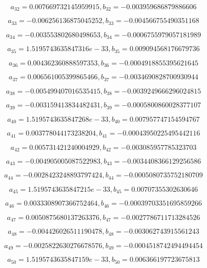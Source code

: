 \documentclass[12pt]{article}
\begin{document}
$$a_{ 32 } = 0.007669732145959915 , b_{ 32 } = -0.003959686879886606$$

$$a_{ 33 } = -0.006256136875045252 , b_{ 33 } = -0.004566755490351168$$

$$a_{ 34 } = -0.003553802680498653 , b_{ 34 } = -0.0006755979057181989$$

$$a_{ 35 } = 1.5195743635847316e-33 , b_{ 35 } = 0.009094568176679736$$

$$a_{ 36 } = 0.004362360888597353 , b_{ 36 } = -0.0004918855395621645$$

$$a_{ 37 } = 0.006561005399865466 , b_{ 37 } = -0.0034690828700930944$$

$$a_{ 38 } = -0.005499407016535415 , b_{ 38 } = -0.0039249666296024815$$

$$a_{ 39 } = -0.003159413834482431 , b_{ 39 } = -0.0005800860028377107$$

$$a_{ 40 } = 1.5195743635847268e-33 , b_{ 40 } = 0.007957747154594767$$

$$a_{ 41 } = 0.003778044173238204 , b_{ 41 } = -0.00043950225495442116$$

$$a_{ 42 } = 0.005731421240004929 , b_{ 42 } = -0.003085957785323703$$

$$a_{ 43 } = -0.004905005087522983 , b_{ 43 } = -0.0034408366129256586$$

$$a_{ 44 } = -0.0028423248893797424 , b_{ 44 } = -0.0005080735752180709$$

$$a_{ 45 } = 1.5195743635847215e-33 , b_{ 45 } = 0.00707355302630646$$

$$a_{ 46 } = 0.0033308907366752464 , b_{ 46 } = -0.00039703351695859266$$

$$a_{ 47 } = 0.0050875680137263376 , b_{ 47 } = -0.0027786711713284526$$

$$a_{ 48 } = -0.004426026511190478 , b_{ 48 } = -0.003062743915561243$$

$$a_{ 49 } = -0.0025822630276678576 , b_{ 49 } = -0.0004518742494494454$$

$$a_{ 50 } = 1.5195743635847159e-33 , b_{ 50 } = 0.006366197723675813$$
\end{document}
